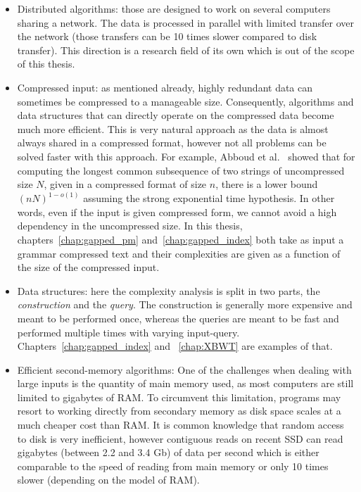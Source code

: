 \begin{itemize}
\item Distributed algorithms: those are designed to work on several computers sharing a network. The data is processed in parallel with limited transfer over the network (those transfers can be 10 times slower compared to disk transfer). This direction is a research field of its own which is out of the scope of this thesis.
\item Compressed input: as mentioned already, highly redundant data can sometimes be compressed to a manageable size. 
Consequently, algorithms and data structures that can directly operate on the compressed data become much more efficient. This is very natural approach as the data is almost always shared in a compressed format, however not all problems can be solved faster with this approach. For example, Abboud et al.~\cite{abboud2017fine} showed that for computing the longest common subsequence of two strings of uncompressed size $N$, given in a compressed format of size $n$, there is a lower bound $(nN)^{1-o(1)}$ assuming the strong exponential time hypothesis. In other words, even if the input is given compressed form, we cannot avoid a high dependency in the uncompressed size. In this thesis, 
chapters~\ref{chap:gapped_pm} and~\ref{chap:gapped_index} both take as input a grammar compressed text and their complexities are given as a function of the size of the compressed input.
\item Data structures: here the complexity analysis is split in two parts, the \emph{construction} and the \emph{query}. The construction is generally more expensive and meant to be performed once, whereas the queries are meant to be fast and performed multiple times with varying input-query.
Chapters~\ref{chap:gapped_index} and ~\ref{chap:XBWT} are examples of that.
\item Efficient second-memory algorithms: One of the challenges when dealing with large inputs is the quantity of main memory used, as most computers are still limited to gigabytes of RAM. To circumvent this limitation, programs may resort to working directly from secondary memory as disk space scales at a much cheaper cost than RAM.
It is  common knowledge that random access to disk is very inefficient, however contiguous reads on recent SSD can read gigabytes (between 2.2 and 3.4 Gb) of data per second which is either comparable to the speed of reading from main memory or only 10 times slower (depending on the model of RAM).

\end{itemize}
